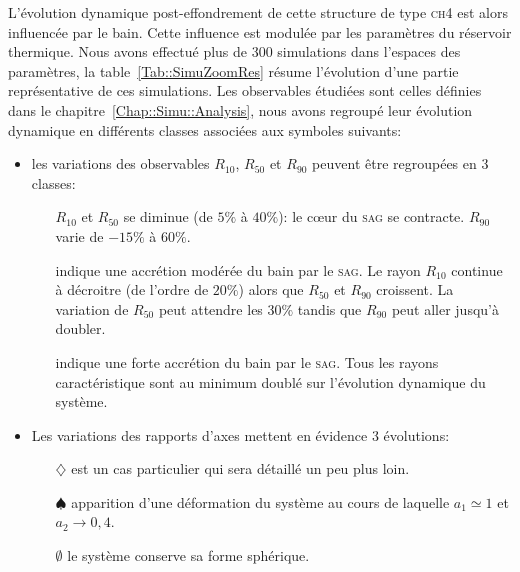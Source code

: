 
	L'évolution dynamique post-effondrement de cette structure de type \textsc{ch4} est alors influencée par le bain. Cette influence est modulée
	par les paramètres du réservoir thermique. Nous avons effectué plus de 300 simulations dans l'espaces des paramètres, la
	table~\ref{Tab::SimuZoomRes} résume l'évolution d'une partie représentative de ces simulations.
	Les observables étudiées sont celles définies dans le chapitre~\ref{Chap::Simu::Analysis}, nous avons regroupé leur évolution dynamique en
	différents classes associées aux symboles suivants:

	\begin{itemize}

		\item les variations des observables $R_{10}$, $R_{50}$ et $R_{90}$ peuvent être regroupées en 3 classes:
			\begin{itemize}

				\item[\accretionpeu{}] $R_{10}$ et $R_{50}$ se diminue (de $5\%$ à $40\%$): le cœur du \textsc{sag} se
					contracte. $R_{90}$ varie de $-15\%$ à $60\%$.

				\item[\accretionmoyen{}] indique une accrétion modérée du bain par le \textsc{sag}. Le rayon $R_{10}$ continue
					à décroitre (de l'ordre de $20\%$) alors que $R_{50}$ et $R_{90}$ croissent. La variation de $R_{50}$ peut
					attendre les $30\%$ tandis que $R_{90}$ peut aller jusqu'à doubler.

				\item[\accretionlot{}] indique une forte accrétion du bain par le \textsc{sag}. Tous les rayons caractéristique sont
					au minimum doublé sur l'évolution dynamique du système.
			\end{itemize}

		\item Les variations des rapports d'axes mettent en évidence 3 évolutions:
			\begin{itemize}

				\item[$\diamondsuit$] est un cas particulier qui sera détaillé un peu plus loin.

				\item[$\spadesuit$] apparition d'une déformation du système au cours de laquelle $a_1 \simeq 1$ et $a_2 \to 0,4$.

				\item[$\emptyset$] le système conserve sa forme sphérique.

			\end{itemize}
	\end{itemize}

